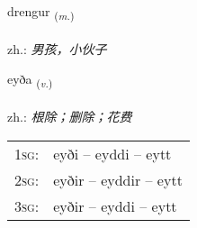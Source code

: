 \documentclass[frontgrid, backgrid]{flacards}\usepackage[]{graphicx}\usepackage[]{xcolor}
\begin{document}
\renewcommand{\blhead}{\vskip5pt {\small\bfseries\footnotesize Nafnorð | 名词 }}
\renewcommand{\bcfoot}{\vskip5pt \hspace{2pt}{\small\bfseries\footnotesize 1K}}


{drengur \small{\textsubscript{(\textit{m.})}} \\[1ex] %
\textphonetic{[treiŋkʏr]} \\
zh.: \emph{男孩，小伙子} \\  [2ex]
\renewcommand*{\arraystretch}{0.8}
}

\renewcommand{\flhead}{\vskip5pt \fboxsep=0pt {\small\bfseries\footnotesize Sagnorð | 动词}}
\renewcommand{\fcfoot}{\vskip5pt \fboxsep=0pt \hspace{2pt}{\small\bfseries\footnotesize 1K}}

\renewcommand{\blhead}{\vskip5pt {\small\bfseries\footnotesize Sagnorð | 动词 }}
\renewcommand{\bcfoot}{\vskip5pt \hspace{2pt}{\small\bfseries\footnotesize 1K}}


{eyða \small{\textsubscript{(\textit{v.})}} \\[1ex] %
\textphonetic{[eiːða]} \\
zh.: \emph{根除；删除；花费} \\  [2ex]
\renewcommand*{\arraystretch}{0.8}
\begin{tabular}{p{1cm}l}
\textsc{1sg}: & eyði -- eyddi -- eytt \\ 
\textsc{2sg}: & eyðir -- eyddir -- eytt \\ 
\textsc{3sg}: & eyðir -- eyddi -- eytt \\ 
\end{tabular}
}

\renewcommand{\flhead}{\vskip5pt \fboxsep=0pt {\small\bfseries\footnotesize Sagnorð | 动词}}
\renewcommand{\fcfoot}{\vskip5pt \fboxsep=0pt \hspace{2pt}{\small\bfseries\footnotesize 1K}}
\end{document}
